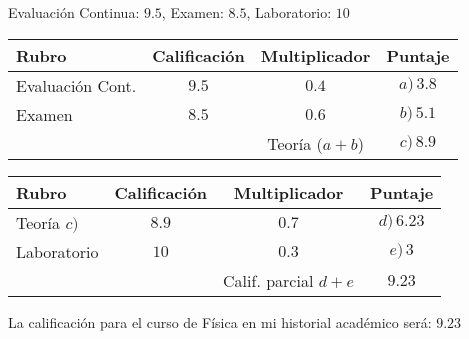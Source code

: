 \documentclass[14pt]{extarticle}
\begin{document}
\vspace*{0.5cm}
\noindent
Evaluación Continua: $9.5$, Examen: $8.5$, Laboratorio: $10$
\begin{table}[H]
    \centering
    \begin{tabular}{| l | c | c | c |} \hline
        Rubro & Calificación & Multiplicador & Puntaje \\ \hline
        Evaluación Cont. & $9.5$ & $0.4$ & $a) \, 3.8$ \\ \hline
        Examen & $8.5$ & $0.6$ & $b) \, 5.1$ \\ \hline
         & & Teoría ($a + b$) & $c) \, 8.9$ \\ \hline
    \end{tabular}
\end{table}
\begin{table}[H]
    \centering
    \begin{tabular}{| l | c | c | c |} \hline
        Rubro & Calificación & Multiplicador & Puntaje \\ \hline
        Teoría $c)$ & $8.9$ & $0.7$ & $d) \, 6.23$ \\ \hline
        Laboratorio & $10$ & $0.3$ & $e) \, 3$ \\ \hline
         & & Calif. parcial $d + e$ & $9.23$  \\ \hline        
    \end{tabular}
\end{table}
La calificación para el curso de Física en mi historial académico será: \underline{$9.23$}
\end{document}
